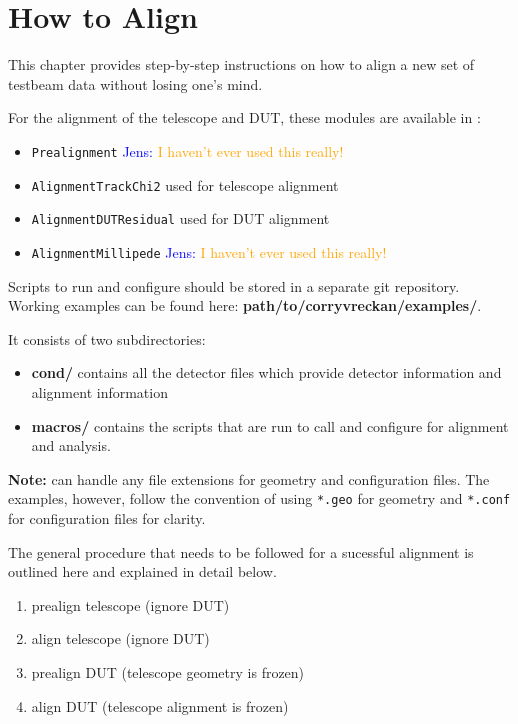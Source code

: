 \chapter{How to Align}
\label{ch:howtoalign}

This chapter provides step-by-step instructions on how to align a new set of testbeam data without losing one's mind.

For the alignment of the telescope and DUT, these modules are available in \corry:
\begin{itemize}
\item \texttt{Prealignment} \textcolor{blue}{Jens: }\textcolor{orange}{I haven't ever used this really!}
\item \texttt{AlignmentTrackChi2} used for telescope alignment
\item \texttt{AlignmentDUTResidual} used for DUT alignment
\item \texttt{AlignmentMillipede} \textcolor{blue}{Jens: }\textcolor{orange}{I haven't ever used this really!}
\end{itemize}

Scripts to run and configure \corry should be stored in a separate git repository.
Working examples can be found here: \textbf{path/to/corryvreckan/examples/}.

It consists of two subdirectories:
\begin{itemize}
\item \textbf{cond/} contains all the detector files which provide detector information and alignment information
\item \textbf{macros/} contains the scripts that are run to call and configure \corry for alignment and analysis.
\end{itemize}

\textbf{Note:} \corry can handle any file extensions for geometry and configuration files. The examples, however, follow the convention of using \texttt{*.geo} for geometry and \texttt{*.conf} for configuration files for clarity.

The general procedure that needs to be followed for a sucessful alignment is outlined here and explained in detail below.
\begin{enumerate}
\item prealign telescope (ignore DUT)
\item align telescope (ignore DUT)
\item prealign DUT (telescope geometry is frozen)
\item align DUT (telescope alignment is frozen)
\end{enumerate}

